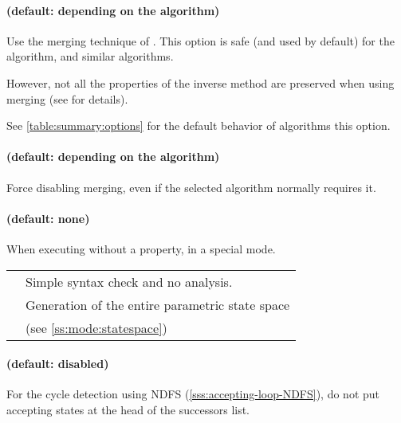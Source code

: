\paragraph{ (default: depending on the algorithm)}
Use the merging technique of \cite{AFS13atva}.
This option is safe (and used by default) for the \EFsynth{} algorithm, and similar algorithms.

However, not all the properties of the inverse method are preserved when using merging (see \cite{AFS13atva} for details).

See \cref{table:summary:options} for the default behavior of algorithms \wrt{} this option.


\paragraph{ (default: depending on the algorithm)}
Force disabling merging, even if the selected algorithm normally requires it.


\paragraph{ (default: none)}
When executing \imitator{} without a property, \ie{} in a special mode.

\begin{longtable}{@{} l @{\ \ } p{12cm}}
	\styleOption{checksyntax} & Simple syntax check and no analysis.
	\\

	\styleOption{statespace}  & Generation of the entire parametric state space \\
	                          & (see \cref{ss:mode:statespace})                 \\
\end{longtable}

\paragraph{ (default: disabled)}
For the cycle detection using NDFS (\cref{sss:accepting-loop-NDFS}),
do not put accepting states at the head of the successors list.


